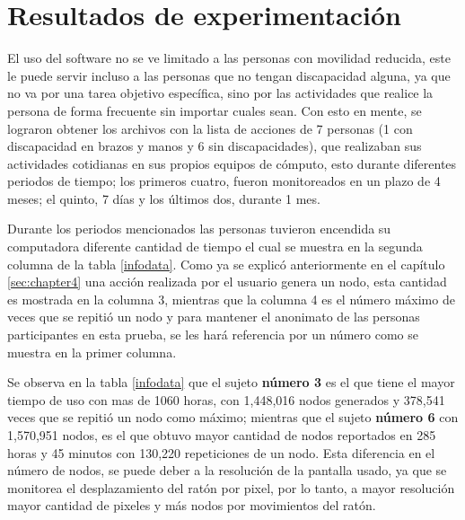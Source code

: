 \section{Resultados de experimentaci\'on}

El uso del software no se ve limitado a las personas con movilidad reducida,
 este le puede servir incluso a las personas que no tengan discapacidad 
 alguna, ya que no va por una tarea objetivo espec\'ifica, sino por las 
 actividades que realice la persona de forma frecuente sin importar cuales 
 sean. Con esto en mente, se lograron obtener los archivos con la lista de
 acciones de 7 personas (1 con discapacidad en brazos y manos y 6 sin 
 discapacidades), que realizaban sus actividades cotidianas en sus propios 
 equipos de c\'omputo, esto durante diferentes periodos de tiempo; los primeros 
 cuatro, fueron monitoreados en un plazo de 4 meses; el quinto, 7 d\'ias y los 
 \'ultimos dos, durante 1 mes. 
 
Durante los periodos mencionados las personas tuvieron encendida su 
 computadora diferente cantidad 
 de tiempo el cual se muestra en la segunda columna de la tabla 
 \ref{infodata}. Como ya se explic\'o anteriormente en el cap\'itulo 
 \ref{sec:chapter4} una acci\'on realizada por el usuario genera un nodo, 
 esta cantidad es mostrada en la columna 3, mientras que la columna 4 es el 
 n\'umero m\'aximo de veces que se repiti\'o un nodo y para mantener el 
 anonimato de las personas participantes en esta prueba, se les har\'a 
 referencia por un n\'umero como se muestra en la primer columna. 

Se observa en la tabla \ref{infodata} que el sujeto \textbf{n\'umero 3}
 es el que tiene el mayor tiempo de uso con mas de 1060 horas, con
 1,448,016 nodos generados y 378,541 veces que se repiti\'o un nodo como 
 m\'aximo; mientras que el sujeto \textbf{n\'umero 6} con 1,570,951 nodos, es 
 el que obtuvo mayor cantidad de nodos reportados en 285 horas y 45 minutos 
 con 130,220 repeticiones de un nodo. Esta diferencia en el n\'umero de nodos, 
 se puede deber a la resoluci\'on de la pantalla usado, ya que se monitorea el 
 desplazamiento del rat\'on por pixel, por lo tanto, a mayor resoluci\'on mayor 
 cantidad de pixeles y m\'as nodos por movimientos del rat\'on.
 

